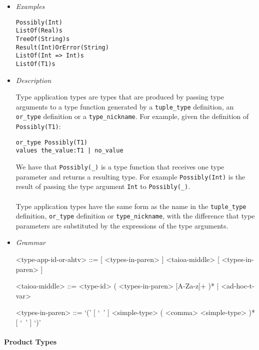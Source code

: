 \documentclass[diploma]{softlab-thesis}
\begin{document}
\begin{itemize}
\item \textit{Examples}
\begin{verbatim}
Possibly(Int)
ListOf(Real)s
TreeOf(String)s
Result(Int)OrError(String)
ListOf(Int => Int)s
ListOf(T1)s
\end{verbatim}

\item \textit{Description}

Type application types are types that are produced by passing type arguments to
a type function generated by a \verb|tuple_type| definition, an \verb|or_type|
definition or a \verb|type_nickname|. For example, given the definition of
\verb|Possibly(T1)|:
\begin{verbatim}
or_type Possibly(T1)
values the_value:T1 | no_value
\end{verbatim}
We have that \verb|Possibly(_)| is a type function that receives one type
parameter and returns a resulting type. For example \verb|Possibly(Int)| is
the result of passing the type argument \verb|Int| to \verb|Possibly(_)|.
\\\\
Type application types have the same form as the name in the \verb|tuple_type|
definition, \verb|or_type| definition or \verb|type_nickname|, with the
difference that type parameters are substituted by the expressions of the type
arguments.

\item \textit{Grammar}
\begin{grammar}
<type-app-id-or-ahtv> ::=
[ <types-in-paren> ] <taioa-middle> [ <types-in-paren> ]

<taioa-middle> ::=
<type-id> ( <types-in-paren> [A-Za-z]+ )* | <ad-hoc-t-var>

<types-in-paren> ::=
`(' [ `\ ' ] <simple-type> ( <comma> <simple-type> )* [ `\ ' ] `)'
\end{grammar}
\end{itemize}

\newpage

\paragraph{Product Types}
\end{document}

